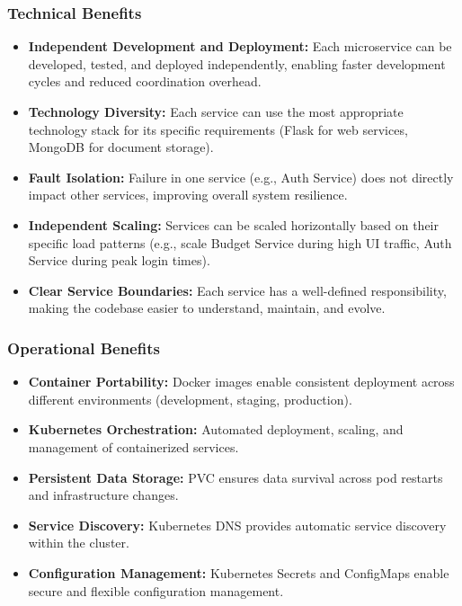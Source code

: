 \documentclass[conference]{IEEEtran}
\begin{document}
\subsubsection{Technical Benefits}
\begin{itemize}
  \item \textbf{Independent Development and Deployment:} Each microservice can be developed, tested, and deployed independently, enabling faster development cycles and reduced coordination overhead.
  \item \textbf{Technology Diversity:} Each service can use the most appropriate technology stack for its specific requirements (Flask for web services, MongoDB for document storage).
  \item \textbf{Fault Isolation:} Failure in one service (e.g., Auth Service) does not directly impact other services, improving overall system resilience.
  \item \textbf{Independent Scaling:} Services can be scaled horizontally based on their specific load patterns (e.g., scale Budget Service during high UI traffic, Auth Service during peak login times).
  \item \textbf{Clear Service Boundaries:} Each service has a well-defined responsibility, making the codebase easier to understand, maintain, and evolve.
\end{itemize}

\subsubsection{Operational Benefits}
\begin{itemize}
  \item \textbf{Container Portability:} Docker images enable consistent deployment across different environments (development, staging, production).
  \item \textbf{Kubernetes Orchestration:} Automated deployment, scaling, and management of containerized services.
  \item \textbf{Persistent Data Storage:} PVC ensures data survival across pod restarts and infrastructure changes.
  \item \textbf{Service Discovery:} Kubernetes DNS provides automatic service discovery within the cluster.
  \item \textbf{Configuration Management:} Kubernetes Secrets and ConfigMaps enable secure and flexible configuration management.
\end{itemize}
\end{document}
